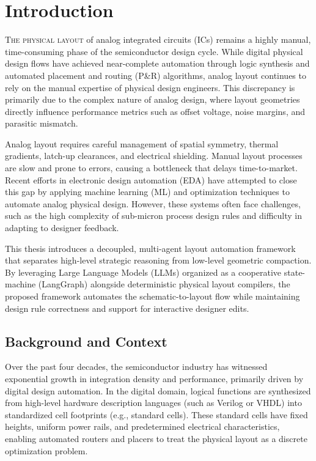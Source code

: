 
\chapter{Introduction}
\label{ch:introduction}

\lettrine[lines=3]{T}{he physical layout} of analog integrated circuits (ICs) remains a highly manual, time-consuming phase of the semiconductor design cycle. While digital physical design flows have achieved near-complete automation through logic synthesis and automated placement and routing (P\&R) algorithms, analog layout continues to rely on the manual expertise of physical design engineers. This discrepancy is primarily due to the complex nature of analog design, where layout geometries directly influence performance metrics such as offset voltage, noise margins, and parasitic mismatch.

Analog layout requires careful management of spatial symmetry, thermal gradients, latch-up clearances, and electrical shielding. Manual layout processes are slow and prone to errors, causing a bottleneck that delays time-to-market. Recent efforts in electronic design automation (EDA) have attempted to close this gap by applying machine learning (ML) and optimization techniques to automate analog physical design. However, these systems often face challenges, such as the high complexity of sub-micron process design rules and difficulty in adapting to designer feedback.

This thesis introduces a decoupled, multi-agent layout automation framework that separates high-level strategic reasoning from low-level geometric compaction. By leveraging Large Language Models (LLMs) organized as a cooperative state-machine (LangGraph) alongside deterministic physical layout compilers, the proposed framework automates the schematic-to-layout flow while maintaining design rule correctness and support for interactive designer edits.

\section{Background and Context}
\label{sec:background}

Over the past four decades, the semiconductor industry has witnessed exponential growth in integration density and performance, primarily driven by digital design automation. In the digital domain, logical functions are synthesized from high-level hardware description languages (such as Verilog or VHDL) into standardized cell footprints (e.g., standard cells). These standard cells have fixed heights, uniform power rails, and predetermined electrical characteristics, enabling automated routers and placers to treat the physical layout as a discrete optimization problem.

